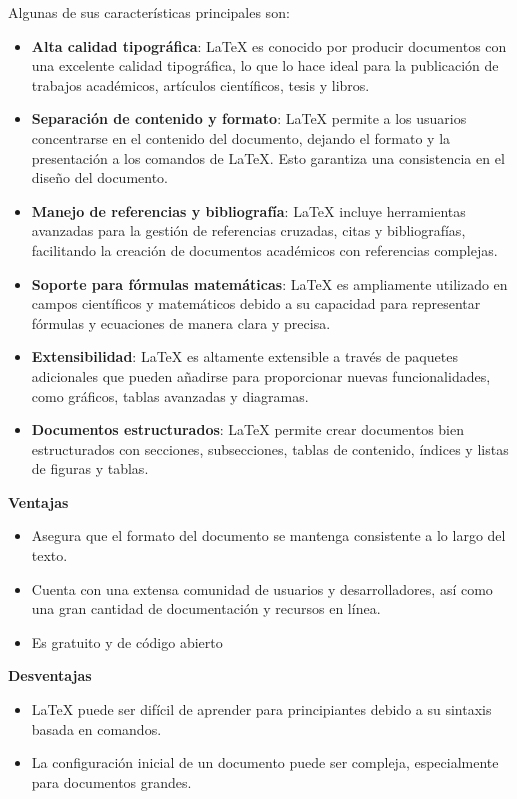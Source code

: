 \documentclass[a4paper, 12pt]{book}
\begin{document}
        Algunas de sus características principales son:
    
        \begin{itemize}
            \item \textbf{Alta calidad tipográfica}: LaTeX es conocido por producir documentos con una excelente calidad tipográfica, lo que lo hace ideal para la publicación de trabajos académicos, artículos científicos, tesis y libros.
            \item \textbf{Separación de contenido y formato}: LaTeX permite a los usuarios concentrarse en el contenido del documento, dejando el formato y la presentación a los comandos de LaTeX. Esto garantiza una consistencia en el diseño del documento.
            \item \textbf{Manejo de referencias y bibliografía}: LaTeX incluye herramientas avanzadas para la gestión de referencias cruzadas, citas y bibliografías, facilitando la creación de documentos académicos con referencias complejas.
            \item \textbf{Soporte para fórmulas matemáticas}: LaTeX es ampliamente utilizado en campos científicos y matemáticos debido a su capacidad para representar fórmulas y ecuaciones de manera clara y precisa.
            \item \textbf{Extensibilidad}: LaTeX es altamente extensible a través de paquetes adicionales que pueden añadirse para proporcionar nuevas funcionalidades, como gráficos, tablas avanzadas y diagramas.
            \item \textbf{Documentos estructurados}: LaTeX permite crear documentos bien estructurados con secciones, subsecciones, tablas de contenido, índices y listas de figuras y tablas.
        \end{itemize}
    
    \textbf{Ventajas}
    
    \begin{itemize}
        \item {Asegura que el formato del documento se mantenga consistente a lo largo del texto.}
        \item {Cuenta con una extensa comunidad de usuarios y desarrolladores, así como una gran cantidad de documentación y recursos en línea.}
        \item {Es gratuito y de código abierto}
    \end{itemize}
    
    \textbf{Desventajas}
    
    \begin{itemize}
        \item {LaTeX puede ser difícil de aprender para principiantes debido a su sintaxis basada en comandos.}
        \item {La configuración inicial de un documento puede ser compleja, especialmente para documentos grandes.}
    \end{itemize}
    
\end{document}
